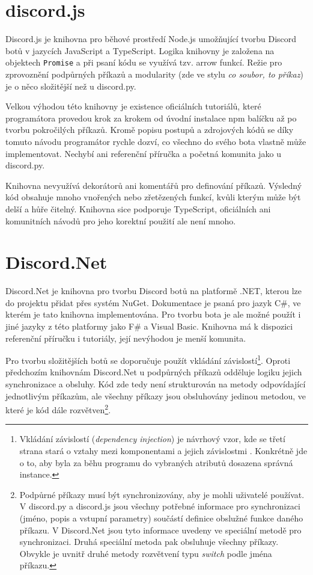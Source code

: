\documentclass[FM]{tulthesis}
\begin{document}
	\section{discord.js}
	
	Discord.js je knihovna pro běhové prostředí Node.js umožňující tvorbu Discord botů v jazycích JavaScript a TypeScript. Logika knihovny je založena na objektech \verb|Promise| a při psaní kódu se využívá tzv. arrow funkcí. Režie pro zprovoznění podpůrných příkazů a modularity (zde ve stylu \textit{co soubor, to příkaz}) je o něco složitější než u discord.py.
	
	Velkou výhodou této knihovny je existence oficiálních tutoriálů, které programátora provedou krok za krokem od úvodní instalace npm balíčku až po tvorbu pokročilých příkazů. Kromě popisu postupů a zdrojových kódů se díky tomuto návodu programátor rychle dozví, co všechno do svého bota vlastně může implementovat. Nechybí ani referenční příručka a početná komunita jako u discord.py.
	
	Knihovna nevyužívá dekorátorů ani komentářů pro definování příkazů. Výsledný kód obsahuje mnoho vnořených nebo zřetězených funkcí, kvůli kterým může být delší a hůře čitelný. Knihovna sice podporuje TypeScript, oficiálních ani komunitních návodů pro jeho korektní použití ale není mnoho.
	
	\section{Discord.Net}
	
	Discord.Net je knihovna pro tvorbu Discord botů na platformě .NET, kterou lze do projektu přidat přes systém NuGet. Dokumentace je psaná pro jazyk C\#, ve kterém je tato knihovna implementována. Pro tvorbu bota je ale možné použít i jiné jazyky z této platformy jako F\# a Visual Basic. Knihovna má k dispozici referenční příručku i tutoriály, její nevýhodou je menší komunita.
	
	Pro tvorbu složitějších botů se doporučuje použít vkládání závislostí\footnote{Vkládání závislostí (\textit{dependency injection}) je návrhový vzor, kde se třetí strana stará o vztahy mezi komponentami a jejich závislostmi \cite{lit_distributedSystems}. Konkrétně jde o to, aby byla za běhu programu do vybraných atributů dosazena správná instance.}. Oproti předchozím knihovnám Discord.Net u podpůrných příkazů odděluje logiku jejich synchronizace a obsluhy. Kód zde tedy není strukturován na metody odpovídající jednotlivým příkazům, ale všechny příkazy jsou obsluhovány jedinou metodou, ve které je kód dále rozvětven\footnote{Podpůrné příkazy musí být synchronizovány, aby je mohli uživatelé používat. V discord.py a discord.js jsou všechny potřebné informace pro synchronizaci (jméno, popis a vstupní parametry) součástí definice obslužné funkce daného příkazu. V Discord.Net jsou tyto informace uvedeny ve speciální metodě pro synchronizaci. Druhá speciální metoda pak obsluhuje všechny příkazy. Obvykle je uvnitř druhé metody rozvětvení typu \textit{switch} podle jména příkazu.}.
	
\end{document}
